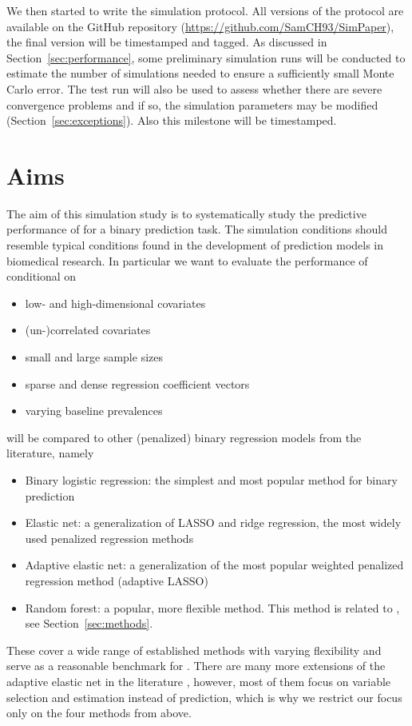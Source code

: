 \documentclass[a4paper, 11pt]{article}\usepackage[]{graphicx}\usepackage[]{color}
\begin{document}
We then started to write the simulation protocol. All versions of the protocol are
available on the GitHub repository (\url{https://github.com/SamCH93/SimPaper}),
the final version will be time\-stamped and tagged. As discussed in
Section~\ref{sec:performance}, some preliminary simulation runs will be conducted
to estimate the number of simulations needed to ensure a sufficiently small Monte
Carlo error. The test run will also be used to assess whether there are severe
convergence problems and if so, the simulation parameters may be modified 
(Section~\ref{sec:exceptions}). Also this milestone will be time\-stamped.

\section{Aims} \label{sec:aims}

The aim of this simulation study is to systematically study the predictive
performance of \ainet{} for a binary prediction task. The simulation conditions
should resemble typical conditions found in the development of prediction models
in biomedical research. In particular we want to evaluate the performance of
\ainet{} conditional on
\begin{itemize}
  \item low- and high-dimensional covariates
  \item (un-)correlated covariates
  \item small and large sample sizes
  \item sparse and dense regression coefficient vectors
  \item varying baseline prevalences
\end{itemize}
\ainet{} will be compared to other (penalized) binary regression models
from the literature, namely
\begin{itemize}
  \item Binary logistic regression: the simplest and most popular method for
        binary prediction
  \item Elastic net: a generalization of LASSO and ridge regression, the most
        widely used penalized regression methods
  \item Adaptive elastic net: a generalization of the most popular weighted 
  penalized regression method (adaptive LASSO)
  \item Random forest: a popular, more flexible method. This method is related to
        \ainet{}, see Section~\ref{sec:methods}.
\end{itemize}
These cover a wide range of established methods with varying flexibility and
serve as a reasonable benchmark for \ainet. There are many more extensions of
the adaptive elastic net in the literature \citep[see \eg the review by][]{Vidaurre2013},
however, most of them focus on variable selection and
estimation instead of prediction, which is why we restrict our focus only on the
four methods from above.
\end{document}
